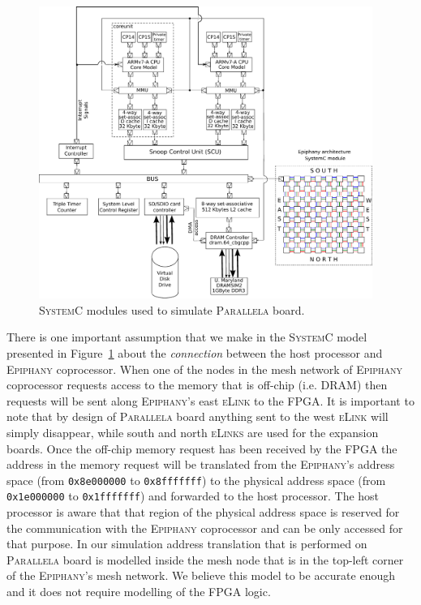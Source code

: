 \documentclass{hitec}
\begin{document}
\begin{figure}
\begin{center}
\includegraphics[width=0.97\textwidth,keepaspectratio=true]{parallela.pdf}
\end{center}
\caption{\textsc{SystemC} modules used to simulate \textsc{Parallela} board.}
\label{fig:parallela}
\end{figure}

There is one important assumption that we make in the \textsc{SystemC}
model presented in Figure~\ref{fig:parallela} about the
\textit{connection} between the host processor and \textsc{Epiphany}
coprocessor. When one of the nodes in the mesh network of
\textsc{Epiphany} coprocessor requests access to the memory that is
off-chip (i.e. DRAM) then requests will be sent along
\textsc{Epiphany}'s east \textsc{eLink} to the FPGA. It is important to
note that by design of \textsc{Parallela} board anything sent to the
west \textsc{eLink} will simply disappear, while south and north
\textsc{eLinks} are used for the expansion boards. Once the off-chip
memory request has been received by the FPGA the address in the memory
request will be translated from the \textsc{Epiphany}'s address space
(from \texttt{0x8e000000} to \texttt{0x8fffffff}) to the physical
address space (from \texttt{0x1e000000} to \texttt{0x1fffffff}) and
forwarded to the host processor. The host processor is aware that that
region of the physical address space is reserved for the communication
with the \textsc{Epiphany} coprocessor and can be only accessed for
that purpose. In our simulation address translation that is performed on
\textsc{Parallela} board is modelled inside the mesh node that is in
the top-left corner of the \textsc{Epiphany}'s mesh network. We
believe this model to be accurate enough and it does not require
modelling of the FPGA logic. 
\end{document}
